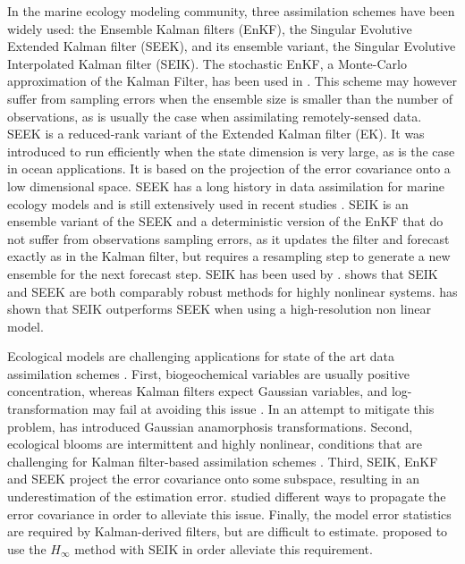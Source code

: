 In the marine ecology modeling community, three assimilation schemes have been
widely used: the Ensemble Kalman filters (EnKF), the Singular Evolutive
Extended Kalman filter (SEEK), and its ensemble variant, the Singular Evolutive
Interpolated Kalman filter (SEIK). The stochastic EnKF, a Monte-Carlo
approximation of the Kalman Filter, has been used in \citet{Ciavatta2011,
Ciavatta2014}. This scheme may however suffer from sampling errors when the
ensemble size is smaller than the number of observations, as is usually the
case when assimilating remotely-sensed data. SEEK is a reduced-rank variant of
the Extended Kalman filter (EK). It was introduced to run efficiently when the
state dimension is very large, as is the case in ocean applications. It is
based  on the projection of the error covariance onto a low dimensional space.
SEEK has a long history in data assimilation for marine ecology models and is
still extensively used in recent studies \citep{Fontana2013, Korres2012,
Butenschon2012}.  SEIK is an ensemble variant of the SEEK  and a deterministic
version of the EnKF that do not suffer from observations sampling errors, as it
updates the filter and forecast exactly as in the Kalman filter, but requires a
resampling step to generate a new ensemble for the next forecast step. SEIK has
been used by \citep{Triantafyllou2012, Korres2012}. \citet{Korres2012} shows
that SEIK and SEEK are both comparably robust methods for highly nonlinear
systems. \citet{Hoteit2005} has shown that SEIK outperforms SEEK when using a
high-resolution non linear model.

Ecological models are challenging applications for state of the art data
assimilation schemes \citep{Edwards2015}. First, biogeochemical variables are
usually positive concentration, whereas Kalman filters expect Gaussian
variables, and log-transformation may fail at avoiding this issue
\citep{Ciavatta2011}. In an attempt to mitigate this problem,
\citet{Fontana2013} has introduced Gaussian anamorphosis transformations.
Second, ecological blooms are intermittent and highly nonlinear, conditions
that are challenging for Kalman filter-based assimilation schemes
\citep{Triantafyllou2012, Korres2012}. Third, SEIK, EnKF and SEEK project the
error covariance onto some subspace, resulting in an underestimation of the
estimation error. \citet{Butenschon2012} studied different ways to propagate
the error covariance in order to alleviate this issue. Finally, the model error
statistics are required by Kalman-derived filters, but are difficult to
estimate. \citet{Triantafyllou2012} proposed to use the $H_\infty$ method with
SEIK in order alleviate this requirement.

